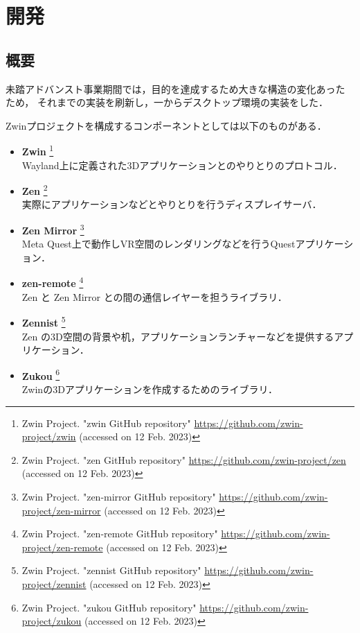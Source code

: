 \section{開発}

\subsection{概要}

未踏アドバンスト事業期間では，目的を達成するため大きな構造の変化あったため，
それまでの実装を刷新し，一からデスクトップ環境の実装をした．

Zwinプロジェクトを構成するコンポーネントとしては以下のものがある．

\begin{itemize}
  \item \textbf{Zwin}
        \footnote{Zwin Project. "zwin GitHub repository" \url{https://github.com/zwin-project/zwin} (accessed on 12 Feb. 2023)} \\
        Wayland上に定義された3Dアプリケーションとのやりとりのプロトコル．
  \item \textbf{Zen}
        \footnote{Zwin Project. "zen GitHub repository" \url{https://github.com/zwin-project/zen} (accessed on 12 Feb. 2023)} \\
        実際にアプリケーションなどとやりとりを行うディスプレイサーバ．
  \item \textbf{Zen Mirror}
        \footnote{Zwin Project. "zen-mirror GitHub repository" \url{https://github.com/zwin-project/zen-mirror} (accessed on 12 Feb. 2023)} \\
        Meta Quest上で動作しVR空間のレンダリングなどを行うQuestアプリケーション．
  \item \textbf{zen-remote}
        \footnote{Zwin Project. "zen-remote GitHub repository" \url{https://github.com/zwin-project/zen-remote} (accessed on 12 Feb. 2023)} \\
        Zen と Zen Mirror との間の通信レイヤーを担うライブラリ．
  \item \textbf{Zennist}
        \footnote{Zwin Project. "zennist GitHub repository" \url{https://github.com/zwin-project/zennist} (accessed on 12 Feb. 2023)} \\
        Zen の3D空間の背景や机，アプリケーションランチャーなどを提供するアプリケーション．
  \item \textbf{Zukou}
        \footnote{Zwin Project. "zukou GitHub repository" \url{https://github.com/zwin-project/zukou} (accessed on 12 Feb. 2023)} \\
        Zwinの3Dアプリケーションを作成するためのライブラリ．
\end{itemize}

